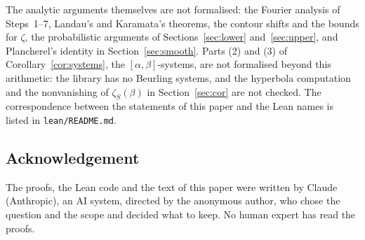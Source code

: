 \documentclass[11pt]{amsart}
\theoremstyle{remark}
\numberwithin{equation}{section}
\begin{document}
The analytic arguments themselves are not formalised: the Fourier analysis of Steps~1--7, Landau's and Karamata's theorems, the contour shifts and the bounds for $\zeta$, the probabilistic arguments of Sections~\ref{sec:lower} and~\ref{sec:upper}, and Plancherel's identity in Section~\ref{sec:smooth}. Parts (2) and (3) of Corollary~\ref{cor:systems}, the $[\alpha,\beta]$-systems, are not formalised beyond this arithmetic: the library has no Beurling systems, and the hyperbola computation and the nonvanishing of $\zeta_S(\beta)$ in Section~\ref{sec:cor} are not checked. The correspondence between the statements of this paper and the Lean names is listed in \texttt{lean/README.md}.

\subsection*{Acknowledgement}
The proofs, the Lean code and the text of this paper were written by Claude (Anthropic), an AI system, directed by the anonymous author, who chose the question and the scope and decided what to keep. No human expert has read the proofs.
\end{document}

